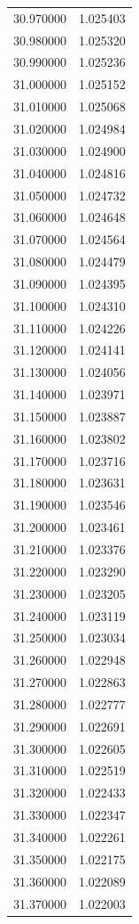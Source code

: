 \begin{tabular}{rr}
30.970000 & 1.025403 \\
30.980000 & 1.025320 \\
30.990000 & 1.025236 \\
31.000000 & 1.025152 \\
31.010000 & 1.025068 \\
31.020000 & 1.024984 \\
31.030000 & 1.024900 \\
31.040000 & 1.024816 \\
31.050000 & 1.024732 \\
31.060000 & 1.024648 \\
31.070000 & 1.024564 \\
31.080000 & 1.024479 \\
31.090000 & 1.024395 \\
31.100000 & 1.024310 \\
31.110000 & 1.024226 \\
31.120000 & 1.024141 \\
31.130000 & 1.024056 \\
31.140000 & 1.023971 \\
31.150000 & 1.023887 \\
31.160000 & 1.023802 \\
31.170000 & 1.023716 \\
31.180000 & 1.023631 \\
31.190000 & 1.023546 \\
31.200000 & 1.023461 \\
31.210000 & 1.023376 \\
31.220000 & 1.023290 \\
31.230000 & 1.023205 \\
31.240000 & 1.023119 \\
31.250000 & 1.023034 \\
31.260000 & 1.022948 \\
31.270000 & 1.022863 \\
31.280000 & 1.022777 \\
31.290000 & 1.022691 \\
31.300000 & 1.022605 \\
31.310000 & 1.022519 \\
31.320000 & 1.022433 \\
31.330000 & 1.022347 \\
31.340000 & 1.022261 \\
31.350000 & 1.022175 \\
31.360000 & 1.022089 \\
31.370000 & 1.022003 \\

\end{tabular}
